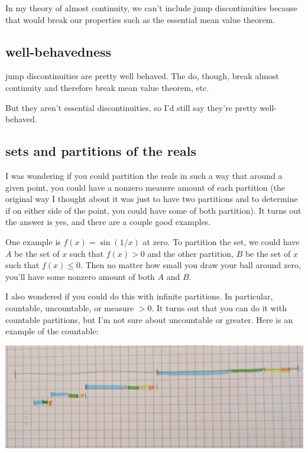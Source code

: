\documentclass{article}
\begin{document}
In my theory of almost continuity, we can't include jump discontinuities because that would break our properties such as the essential mean value theorem.

\subsection{well-behavedness}

jump discontinuities are pretty well behaved. The do, though, break almost continuity and therefore break mean value theorem, etc. 

But they aren't essential discontinuities, so I'd still say they're pretty well-behaved.

\subsection{sets and partitions of the reals}

I was wondering if you could partition the reals in such a way that around a given point, you could have a nonzero meausre amount of each partition (the original way I thought about it was just to have two partitions and to determine if on either side of the point, you could have some of both partition).  It turns out the answer is yes, and there are a couple good examples.

One example is $f(x) = \sin(1/x)$ at zero. To partition the set, we could have $A$ be the set of $x$ such that $f(x)>0$ and the other partition, $B$ be the set of $x$ such that $f(x)\leq 0$.  Then no matter how small you draw your ball around zero, you'll have some nonzero amount of both $A$ and $B$.

I also wondered if you could do this with infinite partitions. In particular, countable, uncountable, or measure $>0$.  It turns out that you can do it with countable partitions, but I'm not sure about uncountable or greater.  Here is an example of the countable:

\includegraphics[width=7in]{set-partitions.jpg}
\centering
\end{document}
